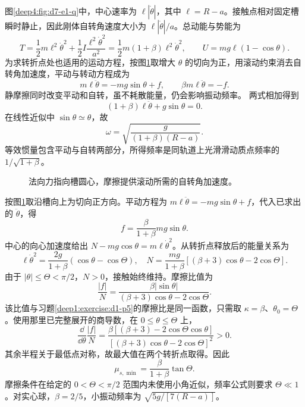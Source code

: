\begin{solution}
图\ref{deep4:fig:d7-e1-q}中，中心速率为 $\ell|\dot\theta|$，其中 $\ell=R-a$。接触点相对固定槽瞬时静止，因此刚体自转角速度大小为 $\ell|\dot\theta|/a$。总动能与势能为
\[
T=\frac12m\ell^2\dot\theta^2+\frac12I\frac{\ell^2\dot\theta^2}{a^2}
=\frac12m(1+\beta)\ell^2\dot\theta^2,
\qquad U=mg\ell(1-\cos\theta).
\]
为求转折点处也适用的运动方程，按图\ref{deep4:fig:d7-e1-s}取增大 $\theta$ 的切向为正，用滚动约束消去自转角加速度，平动与转动方程成为
\[
m\ell\ddot\theta=-mg\sin\theta+f,\qquad
\beta m\ell\ddot\theta=-f.
\]
静摩擦同时改变平动和自转，虽不耗散能量，仍会影响振动频率。
两式相加得到
\[
(1+\beta)\ell\ddot\theta+g\sin\theta=0.
\]
在线性近似中 $\sin\theta\simeq\theta$，故
\[
\boxed{\omega=\sqrt{\frac{g}{(1+\beta)(R-a)}}.}
\]
等效惯量包含平动与自转两部分，所得频率是同轨道上光滑滑动质点频率的 $1/\sqrt{1+\beta}$。
\begin{figure}[H]\centering
{}
\caption{法向力指向槽圆心，摩擦提供滚动所需的自转角加速度。}\label{deep4:fig:d7-e1-s}
\end{figure}
按图\ref{deep4:fig:d7-e1-s}取沿槽向上为切向正方向。平动方程为 $m\ell\ddot\theta=-mg\sin\theta+f$，代入已求出的 $\ddot\theta$，得
\[
f=\frac{\beta}{1+\beta}mg\sin\theta.
\]
中心的向心加速度给出 $N-mg\cos\theta=m\ell\dot\theta^2$。从转折点释放后的能量关系为
\[
\ell\dot\theta^2=\frac{2g}{1+\beta}(\cos\theta-\cos\Theta),
\quad
N=\frac{mg}{1+\beta}[(\beta+3)\cos\theta-2\cos\Theta].
\]
由于 $|\theta|\le\Theta<\pi/2$，$N>0$，接触始终维持。摩擦比值为
\[
\frac{|f|}{N}=\frac{\beta|\sin\theta|}{(\beta+3)\cos\theta-2\cos\Theta}.
\]
该比值与习题\ref{deep1:exercise:d1-p5}的摩擦比是同一函数，只需取 $\kappa=\beta$、$\theta_0=\Theta$。使用那里已完整展开的商导数，在 $0\le\theta\le\Theta$ 上，
\[
\frac{\dd}{\dd\theta}\frac{|f|}{N}
=\frac{\beta[(\beta+3)-2\cos\Theta\cos\theta]}
{[(\beta+3)\cos\theta-2\cos\Theta]^2}>0.
\]
其余半程关于最低点对称，故最大值在两个转折点取得。因此
\[
\boxed{\mu_{s,\min}=\frac{\beta}{1+\beta}\tan\Theta.}
\]
摩擦条件在给定的 $0<\Theta<\pi/2$ 范围内未使用小角近似，频率公式则要求 $\Theta\ll1$。对实心球，$\beta=2/5$，小振动频率为 $\sqrt{5g/[7(R-a)]}$。
\end{solution}



